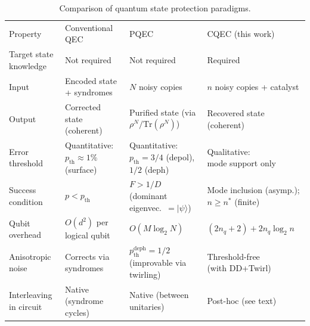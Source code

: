 \documentclass[pra,twocolumn,superscriptaddress,longbibliography,floatfix]{revtex4-2}
\begin{document}
\begin{table}[t]
\caption{Comparison of quantum state protection paradigms.}
\label{tab:paradigms}
\centering\footnotesize
\setlength{\tabcolsep}{4pt}
\begin{ruledtabular}
\begin{tabular}{llll}
Property & Conventional QEC & PQEC~\cite{Raghoonanan2026} & CQEC (this work) \\
\colrule
Target state knowledge & Not required & Not required & Required \\
Input & \makecell[l]{Encoded state\\+ syndromes} & $N$ noisy copies & \makecell[l]{$n$ noisy copies\\+ catalyst} \\
Output & \makecell[l]{Corrected state\\(coherent)} & \makecell[l]{Purified state\\(via $\rho^N/\mathrm{Tr}(\rho^N)$)} & \makecell[l]{Recovered state\\(coherent)} \\
Error threshold & \makecell[l]{Quantitative:\\$p_\mathrm{th} \approx 1\%$ (surface)} & \makecell[l]{Quantitative: $p_\mathrm{th} = 3/4$\\(depol), $1/2$ (deph)} & \makecell[l]{Qualitative:\\mode support only} \\
Success condition & $p < p_\mathrm{th}$ & \makecell[l]{$F > 1/D$ (dominant\\eigenvec.\ $= |\psi\rangle$)} & \makecell[l]{Mode inclusion (asymp.);\\$n \geq n^*$ (finite)} \\
Qubit overhead & $O(d^2)$ per logical qubit & $O(M \log_2 N)$ & $(2n_q{+}2) + 2n_q \log_2 n$ \\
Anisotropic noise & Corrects via syndromes & \makecell[l]{$p_\mathrm{th}^{\mathrm{deph}} = 1/2$\\(improvable via twirling)} & \makecell[l]{Threshold-free\\(with DD+Twirl)} \\
Interleaving in circuit & Native (syndrome cycles) & Native (between unitaries) & Post-hoc (see text) \\
\end{tabular}
\end{ruledtabular}
\end{table}
\end{document}
